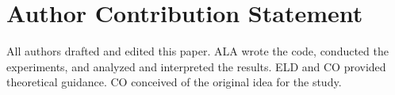 \section{Author Contribution Statement}

All authors drafted and edited this paper. ALA wrote the code, conducted the experiments, and analyzed and interpreted the results. ELD and CO provided theoretical guidance. CO conceived of the original idea for the study.